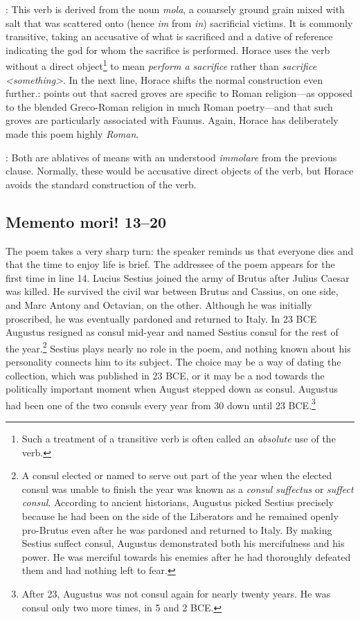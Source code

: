 
: This verb is derived from the noun \textit{mola}, a couarsely ground grain mixed with salt that was scattered onto (hence \textit{im} from \textit{in}) sacrificial victims.  It is commonly transitive, taking an accusative of what is sacrificed and a dative of reference indicating the god for whom the sacrifice is performed.  Horace uses the verb without a direct object\footnote{Such a treatment of a transitive verb is often called an \textit{absolute} use of the verb.} to mean \textit{perform a sacrifice} rather than \textit{sacrifice <something>}.  In the next line, Horace shifts the normal construction even further.\indent{}: \citet[82]{mayer2012} points out that sacred groves are specific  to Roman religion---as opposed to  the blended Greco-Roman religion in much Roman poetry---and that such groves are particularly associated with Faunus.  Again, Horace has deliberately made this poem highly \textit{Roman}.

: Both are ablatives of means with an understood \textit{immolare} from the previous clause.  Normally, these would be accusative direct objects of the verb, but Horace avoids the standard construction of the verb.

\subsection*{Memento mori! 13--20}

The poem takes a very sharp turn: the speaker reminds us that everyone dies and that the time to enjoy life is brief.  The addressee of the poem appears for the first time in line 14.  Lucius Sestius joined the army of Brutus after Julius Caesar was killed.  He survived the civil war between Brutus and Cassius, on one side, and Marc Antony and Octavian, on the other.  Although he was initially proscribed, he was eventually pardoned and returned to Italy.  In 23 BCE Augustus resigned as consul mid-year and named Sestius consul for the rest of the year.\footnote{A consul elected or named to serve out part of the year when the elected consul was unable to finish the year was known as a \textit{consul suffectus} or \textit{suffect consul}.  According to ancient historians, Augustus picked Sestius precisely because he had been on the side of the Liberators and he remained openly pro-Brutus even after he was pardoned and returned to Italy.  By making Sestius suffect consul, Augustus demonstrated both his mercifulness and his power.  He was merciful towards his enemies after he had thoroughly defeated them and had nothing left to fear.}  Sestius plays nearly no role in the poem, and nothing known about his personality connects him to its subject.  The choice may be a way of dating the collection, which was published in 23 BCE, or it may be a nod towards the politically important moment when August stepped down as consul.  Augustus had been one of the two consuls every year from 30 down until 23 BCE.\footnote{After 23, Augustus was not consul again for nearly twenty years.  He was consul only two more times, in 5 and 2 BCE.}

